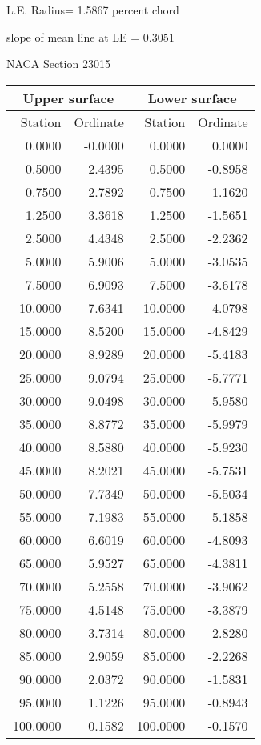 \documentclass[11pt]{book}
\begin{document}
L.E. Radius=  1.5867 percent chord


 slope of mean line at LE =  0.3051
 \newpage
  \label{s23015}
 \begin{Large}
 NACA Section 23015
 \end{Large}
  
 \vspace{8mm}
 \begin{tabular}{|r|r|r|r|} \hline 
 \multicolumn{2}{|c|}{Upper surface} & \multicolumn{2}{|c|}{Lower surface} \\
 \hline
 Station & Ordinate & Station & Ordinate \\
 \hline
0.0000 & -0.0000 & 0.0000 & 0.0000 \\
0.5000 & 2.4395 & 0.5000 & -0.8958 \\
0.7500 & 2.7892 & 0.7500 & -1.1620 \\
1.2500 & 3.3618 & 1.2500 & -1.5651 \\
2.5000 & 4.4348 & 2.5000 & -2.2362 \\
5.0000 & 5.9006 & 5.0000 & -3.0535 \\
7.5000 & 6.9093 & 7.5000 & -3.6178 \\
10.0000 & 7.6341 & 10.0000 & -4.0798 \\
15.0000 & 8.5200 & 15.0000 & -4.8429 \\
20.0000 & 8.9289 & 20.0000 & -5.4183 \\
25.0000 & 9.0794 & 25.0000 & -5.7771 \\
30.0000 & 9.0498 & 30.0000 & -5.9580 \\
35.0000 & 8.8772 & 35.0000 & -5.9979 \\
40.0000 & 8.5880 & 40.0000 & -5.9230 \\
45.0000 & 8.2021 & 45.0000 & -5.7531 \\
50.0000 & 7.7349 & 50.0000 & -5.5034 \\
55.0000 & 7.1983 & 55.0000 & -5.1858 \\
60.0000 & 6.6019 & 60.0000 & -4.8093 \\
65.0000 & 5.9527 & 65.0000 & -4.3811 \\
70.0000 & 5.2558 & 70.0000 & -3.9062 \\
75.0000 & 4.5148 & 75.0000 & -3.3879 \\
80.0000 & 3.7314 & 80.0000 & -2.8280 \\
85.0000 & 2.9059 & 85.0000 & -2.2268 \\
90.0000 & 2.0372 & 90.0000 & -1.5831 \\
95.0000 & 1.1226 & 95.0000 & -0.8943 \\
100.0000 & 0.1582 & 100.0000 & -0.1570 \\
 \hline 
 \end{tabular}
\end{document}
